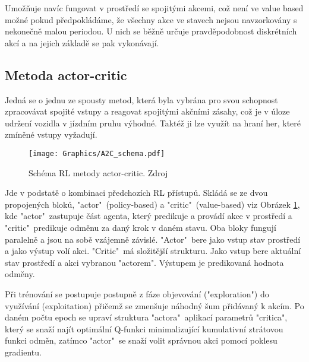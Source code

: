 \documentclass[czech, bc, kky, he, iso690numb]{fasthesis}
\begin{document}
	            Umožňuje navíc fungovat v prostředí se spojitými akcemi, což není ve value based možné pokud předpokládáme, že všechny akce ve stavech nejsou navzorkovány s nekonečně malou periodou. U nich se běžně určuje pravděpodobnost diskrétních akcí a na jejich základě se pak vykonávají.
            
            \newpage
            \subsection{Metoda actor-critic}
            	Jedná se o jednu ze spousty metod, která byla vybrána pro svou schopnost zpracovávat spojité vstupy a reagovat spojitými akčními zásahy, což je v úloze udržení vozidla v jízdním pruhu výhodné. Taktéž ji lze využít na hraní her, které zmíněné vstupy vyžadují.
            		
            		\begin{figure}[h]
            			\centering
            			\texttt{[image: Graphics/A2C\_schema.pdf]}
            			\caption{Schéma RL metody actor-critic. Zdroj \cite{A2C_schema_obr}}
            			\label{pic:actor_critic}
            		\end{figure}
            		
	            Jde v podstatě o kombinaci předchozích RL přístupů. Skládá se ze dvou propojených bloků, "actor"\ (policy-based) a "critic"\ (value-based) viz Obrázek \ref{pic:actor_critic}, kde "actor"\ zastupuje část agenta, který predikuje a provádí akce v prostředí a "critic"\ predikuje odměnu za daný krok v daném stavu. Oba bloky fungují paralelně a jsou na sobě vzájemně závislé. "Actor"\ bere jako vstup stav prostředí a jako výstup volí akci. "Critic"\ má složitější strukturu. Jako vstup bere aktuální stav prostředí a akci vybranou "actorem". Výstupem je predikovaná hodnota odměny.
	            
	            Při trénování se postupuje postupně z fáze objevování ("exploration") do využívání (exploitation) přičemž se zmenšuje náhodný šum přidávaný k akcím. Po daném počtu epoch se upraví struktura "actora"\ aplikací parametrů "critica", který se snaží najít optimální Q-funkci minimalizující kumulativní ztrátovou funkci odměn, zatímco "actor"\ se snaží volit správnou akci pomocí poklesu gradientu. 
	            
\end{document}
